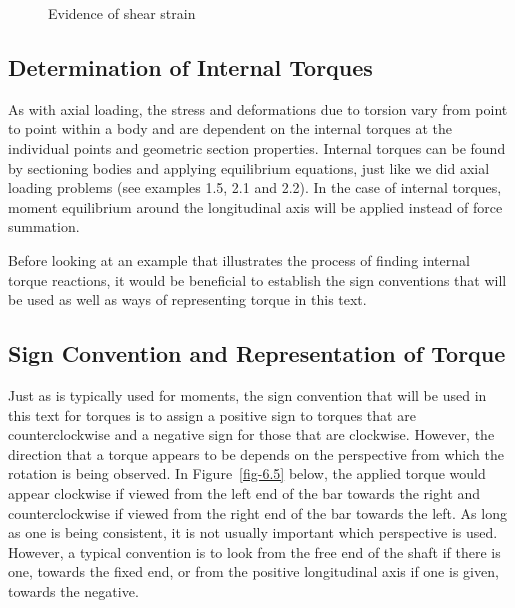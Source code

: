 \documentclass[
  letterpaper,
  DIV=11,
  numbers=noendperiod]{scrreprt}
\theoremstyle{definition}
\theoremstyle{remark}
\begin{document}
\begin{figure}


\caption{\label{fig-6.4}Evidence of shear strain}

\end{figure}%

\subsection{Determination of Internal
Torques}\label{determination-of-internal-torques}

As with axial loading, the stress and deformations due to torsion vary
from point to point within a body and are dependent on the internal
torques at the individual points and geometric section properties.
Internal torques can be found by sectioning bodies and applying
equilibrium equations, just like we did axial loading problems (see
examples 1.5, 2.1 and 2.2). In the case of internal torques, moment
equilibrium around the longitudinal axis will be applied instead of
force summation.

Before looking at an example that illustrates the process of finding
internal torque reactions, it would be beneficial to establish the sign
conventions that will be used as well as ways of representing torque in
this text.

\subsection{Sign Convention and Representation of
Torque}\label{sign-convention-and-representation-of-torque}

Just as is typically used for moments, the sign convention that will be
used in this text for torques is to assign a positive sign to torques
that are counterclockwise and a negative sign for those that are
clockwise. However, the direction that a torque appears to be depends on
the perspective from which the rotation is being observed. In
Figure~\ref{fig-6.5} below, the applied torque would appear clockwise if
viewed from the left end of the bar towards the right and
counterclockwise if viewed from the right end of the bar towards the
left. As long as one is being consistent, it is not usually important
which perspective is used. However, a typical convention is to look from
the free end of the shaft if there is one, towards the fixed end, or
from the positive longitudinal axis if one is given, towards the
negative.
\end{document}
